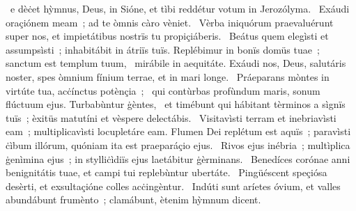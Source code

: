 { }
{%
~e dèċet hỳmnus, Deus, in Sióne, et tìbi reddétur votum in Jerozólyma. 
~Exáudi oraçiónem meam~; ad te òmnis càro vèniet. 
~Vèrba iniquórum praevaluérunt super nos, et impietátibus nostrïs tu propiçiáberis. 
~Beátus quem elegìsti et assumpsìsti~; inhabitábit in átriïs tuïs. Replébimur in bonïs domüs tuae~; sanctum est templum tuum, 
~mirábile in aequitáte. Exáudi nos, Deus, salutáris noster, spes òmnium fínium terrae, et in mari longe. 
~Práeparans mòntes in virtúte tua, acċínctus potènçia~; 
~qui contùrbas profùndum maris, sonum flúctuum ejus. Turbabùntur ġèntes, 
~et timébunt qui hábitant tèrminos a sìgnïs tuïs~; èxitüs matutíni et vèspere delectábis. 
~Visitavìsti terram et inebriavìsti eam~; multiplicavìsti locupletáre eam. Flumen Dei replétum est aquïs~; paravìsti ċìbum illórum, quóniam ita est praeparáçio ejus. 
~Rivos ejus inébria~; multìplica ġenìmina ejus~; in stylliċìdiïs ejus laetábitur ġèrminans. 
~Benedíces corónae anni benignitátis tuae, et campi tui replebùntur ubertáte. 
~Pingüéscent speçiósa desèrti, et exsultaçióne colles acċingèntur. 
~Indúti sunt aríetes óvium, et valles abundábunt frumènto~; clamábunt, ètenim hỳmnum dicent. 
}
